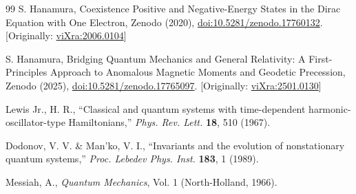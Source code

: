 \documentclass[%
 reprint,
 amsmath,amssymb,
 aps,
]{revtex4-1}
\numberwithin{equation}{section}%
\begin{document}
\begin{thebibliography}{99}
S. Hanamura, Coexistence Positive and Negative-Energy States in the Dirac Equation with One Electron, Zenodo (2020), \href{https://doi.org/10.5281/zenodo.17760132}{doi:10.5281/zenodo.17760132}. [Originally: \href{https://vixra.org/abs/2006.0104}{viXra:2006.0104}]

S. Hanamura, Bridging Quantum Mechanics and General Relativity: A First-Principles Approach to Anomalous Magnetic Moments and Geodetic Precession, Zenodo (2025), \href{https://doi.org/10.5281/zenodo.17765097}{doi:10.5281/zenodo.17765097}. [Originally: \href{https://vixra.org/abs/2501.0130}{viXra:2501.0130}]

 Lewis Jr., H. R.,
``Classical and quantum systems with time-dependent harmonic-oscillator-type Hamiltonians,''
\textit{Phys. Rev. Lett.} \textbf{18}, 510 (1967).

 Dodonov, V. V. \& Man'ko, V. I.,
``Invariants and the evolution of nonstationary quantum systems,''
\textit{Proc. Lebedev Phys. Inst.} \textbf{183}, 1 (1989).

 Messiah, A.,
\textit{Quantum Mechanics}, Vol. 1 (North-Holland, 1966).

\end{thebibliography}

\end{document}
